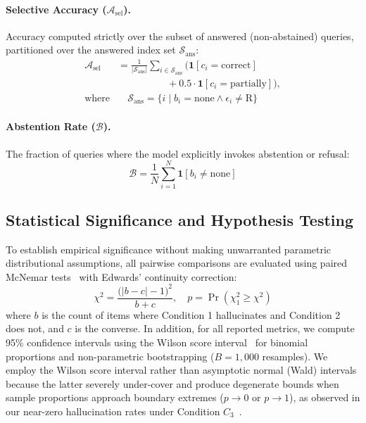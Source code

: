 \documentclass[11pt,a4paper,twocolumn]{article}
\begin{document}
\paragraph{Selective Accuracy ($\mathcal{A}_{\text{sel}}$).} Accuracy computed strictly over the subset of answered (non-abstained) queries, partitioned over the answered index set $\mathcal{S}_{\text{ans}}$:
\begin{equation}
\begin{split}
    \mathcal{A}_{\text{sel}} &= \frac{1}{|\mathcal{S}_{\text{ans}}|} \sum_{i \in \mathcal{S}_{\text{ans}}} \Big(\mathbf{1}[c_i = \text{correct}] \\
    &\qquad\qquad\quad + 0.5 \cdot \mathbf{1}[c_i = \text{partially}]\Big), \\
    \text{where} &\quad \mathcal{S}_{\text{ans}} = \{i \mid b_i = \text{none} \land \epsilon_i \neq \text{R}\}
\end{split}
\label{eq:selective_accuracy}
\end{equation}

\paragraph{Abstention Rate ($\mathcal{B}$).} The fraction of queries where the model explicitly invokes abstention or refusal:
\begin{equation}
    \mathcal{B} = \frac{1}{N} \sum_{i=1}^N \mathbf{1}[b_i \neq \text{none}]
    \label{eq:abstention_rate}
\end{equation}

\subsection{Statistical Significance and Hypothesis Testing}
To establish empirical significance without making unwarranted parametric distributional assumptions, all pairwise comparisons are evaluated using paired McNemar tests~\citep{mcnemar1947note} with Edwards' continuity correction:
\begin{equation}
    \chi^2 = \frac{\big(|b - c| - 1\big)^2}{b + c}, \quad p = \operatorname{Pr}(\chi^2_1 \ge \chi^2)
    \label{eq:mcnemar}
\end{equation}
where $b$ is the count of items where Condition 1 hallucinates and Condition 2 does not, and $c$ is the converse. In addition, for all reported metrics, we compute 95\% confidence intervals using the Wilson score interval~\citep{wilson1927probable} for binomial proportions and non-parametric bootstrapping ($B = 1,000$ resamples). We employ the Wilson score interval rather than asymptotic normal (Wald) intervals because the latter severely under-cover and produce degenerate bounds when sample proportions approach boundary extremes ($p \to 0$ or $p \to 1$), as observed in our near-zero hallucination rates under Condition $C_3$~\citep{brown2001interval}.
\end{document}
